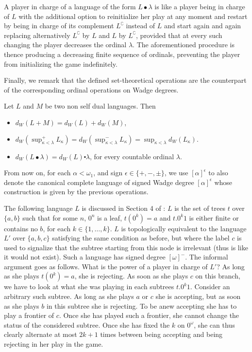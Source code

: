 A player in  charge of a language of the form $L\bullet \lambda$ is like a player being in charge of $L$ with the additional option to reinitialize her play at any moment and restart by being 
in charge of its complement $L^\complement$ instead of $L$ and start again and again replacing alternatively $L^\complement$ by $L$ and  $L$ by 
$L^\complement$,  provided that at every such changing the player decreases the ordinal $\lambda$.  The aforementioned procedure is thence producing a decreasing finite sequence of ordinals, preventing the player from initializing the game indefinitely.


Finally, we remark that  the defined set-theoretical operations are the counterpart of the corresponding ordinal operations on Wadge degrees.

\begin{lemma}
\label{r_mult}
Let $L$ and $ M$ be two non self dual languages. Then 
\begin{itemize}
\item $d_W(L+M)=d_W(L)+d_W(M)$, 
\item$d_W(\sup^+ _{\kappa<\lambda} L_\kappa)= d_W(\sup^- _{\kappa<\lambda} L_\kappa)=\sup_{\kappa<\lambda}d_W( L_\kappa)$.
\item $d_W(L \bullet \lambda)= d_W(L) \centerdot \lambda$, for every countable ordinal $\lambda$.
\end{itemize}
\end{lemma}




From now on, for each $\alpha < \omega_1$, and sign $\epsilon \in \{+,-,\pm\}$, we use  $[\alpha]^\epsilon$ to also denote the canonical complete language of signed Wadge degree $[\alpha]^\epsilon$ whose construction is given by the previous operations.

\begin{remark}
The following language $L$ is discussed in Section 4 of  \cite{bp}: $L$ is the set of trees $t$ over $\{a,b\}$ such that for some $n$, $0^n$ is a leaf, $t(0^k)=a$ and $t.0^k1$ is either finite or contains no $b$, for each $k\in \{1, \dots, k\}$. $L$ is topologically equivalent to the language  $L'$ over $\{a, b, c\}$ satisfying the same condition as before, but where the label $c$ is used to signalize that the subtree starting from this node is irrelevant (thus is like it would not exist). Such a language has signed degree $[\omega]^-$. The informal argument goes as follows. What is the power of a player in charge of $L'$? As long as she plays $t(0^k)=a$, she is rejecting. 
As soon as she plays $c$ on this branch, we have to look at what she was playing in each subtrees  $t.0^k1$. Consider an arbitrary such subtree. As long as she plays $a$ or $c$ she is accepting, but as soon as she plays $b$ in this subtree she is rejecting. To be anew accepting she has to play a frontier of $c$. Once she has played such a frontier, she cannot change the status of the considered subtree. Once she has fixed the $k$ on $0^\omega$, she can thus clearly alternate at most $2k+1$ times between being accepting and being rejecting in her play in the  game. 
\end{remark}

